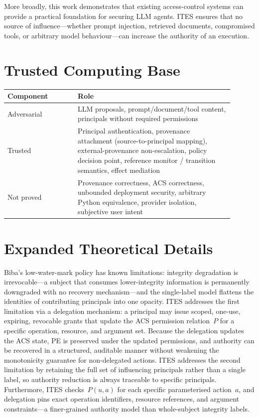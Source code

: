 \documentclass{article}
\begin{document}
More broadly, this work demonstrates that existing access-control systems can
provide a practical foundation for securing LLM agents. ITES ensures that no
source of influence---whether prompt injection, retrieved documents, compromised
tools, or arbitrary model behaviour---can increase the authority of an execution.




\appendix

\section{Trusted Computing Base}
\label{app:tcb}

\begin{center}
\small
\begin{tabular}{p{0.28\linewidth}p{0.62\linewidth}}
\toprule
\textbf{Component} & \textbf{Role} \\
\midrule
Adversarial & LLM proposals, prompt/document/tool content, principals without
required permissions \\
\addlinespace
Trusted & Principal authentication, provenance attachment (source-to-principal
mapping), external-provenance non-escalation, policy decision
point, reference monitor / transition semantics, effect mediation \\
\addlinespace
Not proved & Provenance correctness, ACS correctness, unbounded deployment
security, arbitrary Python equivalence, provider isolation, subjective user
intent \\
\bottomrule
\end{tabular}
\end{center}

\section{Expanded Theoretical Details}
\label{app:theory}

Biba's low-water-mark policy has known limitations: integrity degradation is
irrevocable---a subject that consumes lower-integrity information is
permanently downgraded with no recovery mechanism---and the single-label
model flattens the identities of contributing principals into one opacity.
ITES addresses the first limitation via a delegation mechanism: a principal
may issue scoped, one-use, expiring, revocable grants that update the ACS
permission relation~$P$ for a specific operation, resource, and argument
set. Because the delegation updates the ACS state, PE is preserved under the
updated permissions, and authority can be recovered in a structured,
auditable manner without weakening the monotonicity guarantee for
non-delegated actions. ITES addresses the second limitation by retaining
the full set of influencing principals rather than a single label, so
authority reduction is always traceable to specific principals. Furthermore,
ITES checks~$P(u,a)$ for each specific parameterised action~$a$, and
delegation pins exact operation identifiers, resource references, and
argument constraints---a finer-grained authority model than whole-subject
integrity labels.
\end{document}
